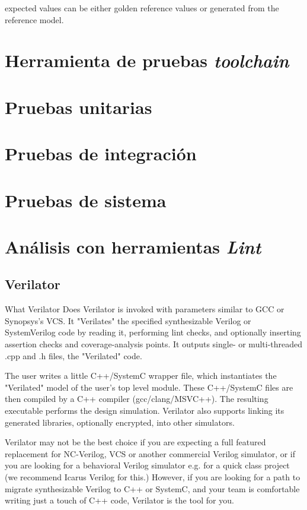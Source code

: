 \documentclass[a4paper]{article}
\begin{document}
expected values can be either golden reference values or generated from the reference model.

\section{Herramienta de pruebas \textit{toolchain}}

\section{Pruebas unitarias}

\section{Pruebas de integración}

\section{Pruebas de sistema}

\section{Análisis con herramientas \textit{Lint}}

\subsection{Verilator}

 What Verilator Does
Verilator is invoked with parameters similar to GCC or Synopsys’s VCS. It "Verilates" the specified synthesizable Verilog or SystemVerilog code by reading it, performing lint checks, and optionally inserting assertion checks and coverage-analysis points. It outputs single- or multi-threaded .cpp and .h files, the "Verilated" code.

The user writes a little C++/SystemC wrapper file, which instantiates the "Verilated" model of the user’s top level module. These C++/SystemC files are then compiled by a C++ compiler (gcc/clang/MSVC++). The resulting executable performs the design simulation. Verilator also supports linking its generated libraries, optionally encrypted, into other simulators.

Verilator may not be the best choice if you are expecting a full featured replacement for NC-Verilog, VCS or another commercial Verilog simulator, or if you are looking for a behavioral Verilog simulator e.g. for a quick class project (we recommend Icarus Verilog for this.) However, if you are looking for a path to migrate synthesizable Verilog to C++ or SystemC, and your team is comfortable writing just a touch of C++ code, Verilator is the tool for you.
\end{document}
